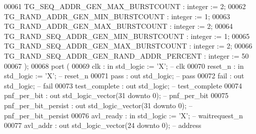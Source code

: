 \begin{DoxyCode}
00061             TG\_SEQ\_ADDR\_GEN\_MAX\_BURSTCOUNT         : \textcolor{comment}{integer} := \textcolor{vhdllogic}{}\textcolor{vhdllogic}{2};
00062             TG\_RAND\_ADDR\_GEN\_MIN\_BURSTCOUNT        : \textcolor{comment}{integer} := \textcolor{vhdllogic}{}\textcolor{vhdllogic}{1};
00063             TG\_RAND\_ADDR\_GEN\_MAX\_BURSTCOUNT        : \textcolor{comment}{integer} := \textcolor{vhdllogic}{}\textcolor{vhdllogic}{2};
00064             TG\_RAND\_SEQ\_ADDR\_GEN\_MIN\_BURSTCOUNT    : \textcolor{comment}{integer} := \textcolor{vhdllogic}{}\textcolor{vhdllogic}{1};
00065             TG\_RAND\_SEQ\_ADDR\_GEN\_MAX\_BURSTCOUNT    : \textcolor{comment}{integer} := \textcolor{vhdllogic}{}\textcolor{vhdllogic}{2};
00066             TG\_RAND\_SEQ\_ADDR\_GEN\_RAND\_ADDR\_PERCENT : \textcolor{comment}{integer} := \textcolor{vhdllogic}{}\textcolor{vhdllogic}{50}
00067         );
00068         \textcolor{keywordflow}{port} (
00069             clk                 : \textcolor{keywordflow}{in}  \textcolor{comment}{std\_logic}                     := 'X';             \textcolor{keyword}{-- clk}
00070             reset\_n             : \textcolor{keywordflow}{in}  \textcolor{comment}{std\_logic}                     := 'X';             \textcolor{keyword}{-- reset\_n}
00071             pass                : \textcolor{keywordflow}{out} \textcolor{comment}{std\_logic};                                        \textcolor{keyword}{-- pass}
00072             fail                : \textcolor{keywordflow}{out} \textcolor{comment}{std\_logic};                                        \textcolor{keyword}{-- fail}
00073             test\_complete       : \textcolor{keywordflow}{out} \textcolor{comment}{std\_logic};                                        \textcolor{keyword}{-- test\_complete}
00074             pnf\_per\_bit         : \textcolor{keywordflow}{out} \textcolor{comment}{std\_logic\_vector}(\textcolor{vhdllogic}{}\textcolor{vhdllogic}{31} \textcolor{keywordflow}{downto} \textcolor{vhdllogic}{}\textcolor{vhdllogic}{0});                    \textcolor{keyword}{-- pnf\_per\_bit}
00075             pnf\_per\_bit\_persist : \textcolor{keywordflow}{out} \textcolor{comment}{std\_logic\_vector}(\textcolor{vhdllogic}{}\textcolor{vhdllogic}{31} \textcolor{keywordflow}{downto} \textcolor{vhdllogic}{}\textcolor{vhdllogic}{0});                    \textcolor{keyword}{--
       pnf\_per\_bit\_persist}
00076             avl\_ready           : \textcolor{keywordflow}{in}  \textcolor{comment}{std\_logic}                     := 'X';             \textcolor{keyword}{-- waitrequest\_n}
00077             avl\_addr            : \textcolor{keywordflow}{out} \textcolor{comment}{std\_logic\_vector}(\textcolor{vhdllogic}{}\textcolor{vhdllogic}{24} \textcolor{keywordflow}{downto} \textcolor{vhdllogic}{}\textcolor{vhdllogic}{0});                    \textcolor{keyword}{-- address}

\end{DoxyCode}
